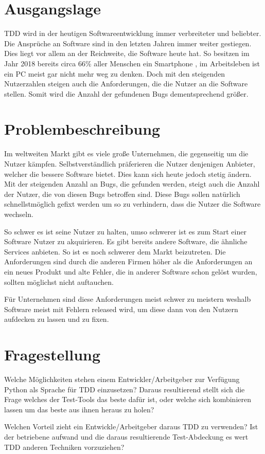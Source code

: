 \section{Ausgangslage}
TDD wird in der heutigen Softwareentwicklung immer verbreiteter und beliebter.
Die Ansprüche an Software sind in den letzten Jahren immer weiter gestiegen. Dies
liegt vor allem an der Reichweite, die Software heute hat. So besitzen im Jahr
2018 bereits circa 66\% aller Menschen ein Smartphone \cite{FraukeSchobelt:Smartphone},
im Arbeitsleben ist ein PC meist gar nicht mehr weg zu denken. Doch mit den steigenden
Nutzerzahlen steigen auch die Anforderungen, die die Nutzer an die Software stellen.
Somit wird die Anzahl der gefundenen Bugs dementsprechend größer.

\section{Problembeschreibung}
Im weltweiten Markt gibt es viele große Unternehmen, die gegenseitig um die
Nutzer kämpfen. Selbstverständlich präferieren die Nutzer denjenigen Anbieter, welcher die bessere
Software bietet. Dies kann sich heute jedoch stetig ändern. Mit der steigenden Anzahl
an Bugs, die gefunden werden, steigt auch die Anzahl der Nutzer, die von diesen Bugs betroffen
sind. Diese Bugs sollen natürlich schnellstmöglich gefixt werden um so zu verhindern,
dass die Nutzer die Software wechseln.

So schwer es ist seine Nutzer zu halten, umso schwerer ist es zum Start einer Software
Nutzer zu akquirieren. Es gibt bereits andere Software, die ähnliche Services anbieten.
So ist es noch schwerer dem Markt beizutreten. Die Anforderungen sind durch die
anderen Firmen höher als die Anforderungen an ein neues Produkt und alte Fehler, die
in anderer Software schon gelöst wurden, sollten möglichst nicht auftauchen.

Für Unternehmen sind diese Anforderungen meist schwer zu meistern weshalb Software
meist mit Fehlern released wird, um diese dann von den Nutzern aufdecken zu lassen und
zu fixen.

\section{Fragestellung}
Welche Möglichkeiten stehen einem Entwickler/Arbeitgeber zur Verfügung Python
als Sprache für TDD einzusetzen? Daraus resultierend stellt sich die Frage
welches der Test-Tools das beste dafür ist, oder welche sich kombinieren lassen
um das beste aus ihnen heraus zu holen?

Welchen Vorteil zieht ein Entwickle/Arbeitgeber daraus TDD zu verwenden? Ist
der betriebene aufwand und die daraus resultierende Test-Abdeckung es wert TDD
anderen Techniken vorzuziehen?
